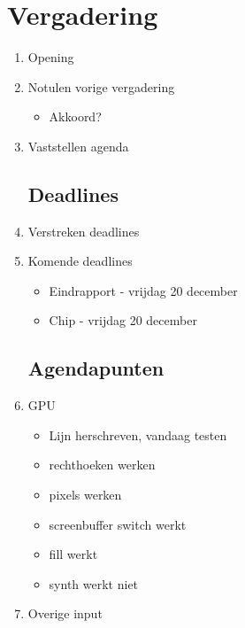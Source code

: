 \documentclass{article}
\begin{document}
\section*{Vergadering}
\begin{enumerate}
	
	\subsection*{Vooraf}
	\item Opening
	\item Notulen vorige vergadering
	\begin{itemize}
		\item Akkoord?
	\end{itemize}
	\item Vaststellen agenda

	\subsection*{Deadlines}
	\item Verstreken deadlines
	\item Komende deadlines
	\begin{itemize}
		\item Eindrapport - vrijdag 20 december
		\item Chip - vrijdag 20 december
	\end{itemize}

	\subsection*{Agendapunten}

	\item GPU
	\begin{itemize}
		\item Lijn herschreven, vandaag testen
		\item rechthoeken werken
		\item pixels werken
		\item screenbuffer switch werkt
		\item fill werkt
		\item synth werkt niet
	\end{itemize}

	\item Overige input

\end{enumerate}
\end{document}
